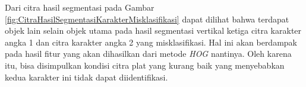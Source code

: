 \noindent Dari citra hasil segmentasi pada Gambar \ref{fig:CitraHasilSegmentasiKarakterMisklasifikasi} dapat dilihat bahwa terdapat objek lain selain objek utama pada hasil segmentasi vertikal ketiga citra karakter angka 1 dan citra karakter angka 2 yang misklasifikasi. Hal ini akan berdampak pada hasil fitur yang akan dihasilkan dari metode \textit{HOG} nantinya. Oleh karena itu, bisa disimpulkan kondisi citra plat yang kurang baik yang menyebabkan kedua karakter ini tidak dapat diidentifikasi.

%
%
